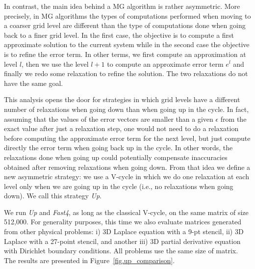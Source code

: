 In contrast, the main idea behind a MG algorithm is rather asymmetric. More
precisely, in MG algorithms the types of computations performed when moving to
a coarser grid level are different than the type of computations done when
going back to a finer grid level. In the first case, the objective is to
compute a first approximate solution to the current system while in the second
case the objective is to refine the error term. In other terms, we first
compute an approximation at level $l$, then we use the level $l+1$ to compute
an approximate error term $e^l$ and finally we redo some relaxation to refine
the solution. The two relaxations do not have the same goal.

This analysis opens the door for strategies in which grid levels have a
different number of relaxations when going down than when going up in the
cycle.  In fact, assuming that the values of the error vectors are smaller
than a given $\epsilon$ from the exact value after just a relaxation step, one
would not need to do a relaxation before computing the approximate error term
for the next level, but just compute directly the error term when going back up
in the cycle. In other words, the relaxations done when going up could
potentially compensate inaccuracies obtained after removing relaxations when
going down. From that idea we define a new asymmetric strategy: we use a
V-cycle in which we do one relaxation at each level only when we are going up
in the cycle (i.e., no relaxations when going down).  We call this strategy
\emph{Up}.

We run \emph{Up} and \emph{Fast4}, as long as the classical V-cycle, on the
same matrix of size 512,000. For generality purposes, this time we also
evaluate matrices generated from other physical problems: i) 3D Laplace equation with a 9-pt stencil, ii) 3D Laplace
with a 27-point stencil, and another iii) 3D partial derivative equation with
Dirichlet boundary conditions. All problems use the same size of matrix. The
results are presented in Figure~\ref{fig.up_comparison}.

